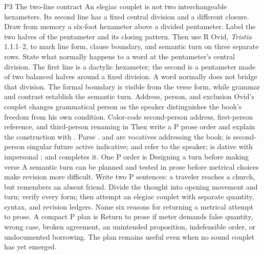 \begin{courseunit}{P3}
\SubmoduleExtension
  {The two-line contract}
  {An elegiac couplet is not two interchangeable hexameters. Its second line
  has a fixed central division and a different closure.}
  {Draw from memory a six-foot hexameter above a divided pentameter. Label the
  two halves of the pentameter and its closing pattern. Then use R Ovid,
  \textit{Tristia} 1.1.1--2, to mark line form, clause boundary, and semantic
  turn on three separate rows.}
  {State what normally happens to a word at the pentameter's central division.}
  {The first line is a dactylic hexameter; the second is a pentameter made of
  two balanced halves around a fixed division. A word normally does not
  bridge that division. The formal boundary is visible from the verse form,
  while grammar and contrast establish the semantic turn.}
\SubmoduleExtension
  {Address, person, and exclusion}
  {Ovid's couplet changes grammatical person as the speaker distinguishes the
  book's freedom from his own condition.}
  {Color-code second-person address, first-person reference, and third-person
  renaming in  Then write a P prose order and explain
  the construction with .}
  {Parse .}
  { and  are vocatives addressing the book;
   is second-person singular future active indicative;
   and  refer to the speaker;  is
  dative with impersonal ; and  completes it. One P
  order is }
\SubmoduleExtension
  {Designing a turn before making verse}
  {A semantic turn can be planned and tested in prose before metrical choices
  make revision more difficult.}
  {Write two P sentences: a traveler reaches a church, but remembers an absent
  friend. Divide the thought into opening movement and turn; verify every
  form; then attempt an elegiac couplet with separate quantity, syntax, and
  revision ledgers.}
  {Name six reasons for returning a metrical attempt to prose.}
  {A compact P plan is  Return to prose if meter demands false
  quantity, wrong case, broken agreement, an unintended proposition,
  indefensible order, or undocumented borrowing. The plan remains useful even
  when no sound couplet has yet emerged.}
\end{courseunit}

